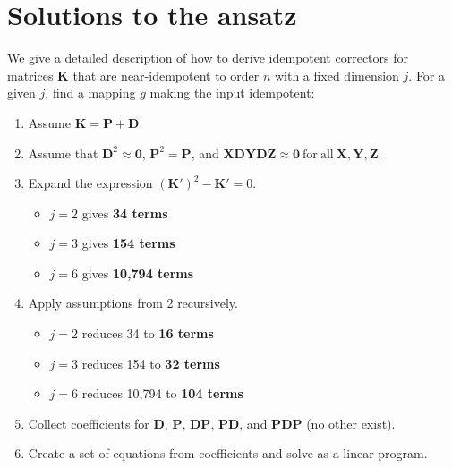 \documentclass{article}
\theoremstyle{plain}
\theoremstyle{definition}
\theoremstyle{remark}
\newcommand{\vD}{\mathbf{D}}
\newcommand{\vK}{\mathbf{K}}
\newcommand{\vP}{\mathbf{P}}
\newcommand{\vX}{\mathbf{X}}
\newcommand{\vY}{\mathbf{Y}}
\newcommand{\vZ}{\mathbf{Z}}
\begin{document}
\section{Solutions to the ansatz}
\label{app:solutions}
We give a detailed description of how to derive idempotent correctors for matrices $\vK$ that are near-idempotent to order $n$ with a fixed dimension $j$. For a given $j$, find a mapping $g$ making the input idempotent:
\begin{enumerate}
    \item Assume $\vK = \vP + \vD$.
    \item {Assume that $\vD^2 \approx \bm{0}$, $\vP^2 = \vP$, and $\vX \vD \vY \vD \vZ \approx \bm{0} \mathrm{~for~all~} \vX,\vY,\vZ$.}
    \item {Expand the expression $(\vK')^2 - \vK' = 0$.
          \begin{itemize}
              \item $j = 2$ gives \textbf{34 terms}
              \item $j = 3$ gives \textbf{154 terms}
              \item $j = 6$ gives \textbf{10,794 terms}
          \end{itemize}
          }
    \item {Apply assumptions from 2 recursively.
          \begin{itemize}
              \item $j = 2$ reduces 34 to \textbf{16 terms}
              \item $j = 3$ reduces 154 to \textbf{32 terms}
              \item $j = 6$ reduces 10,794 to \textbf{104 terms}
          \end{itemize}
          }
    \item Collect coefficients for $\vD$, $\vP$, $\vD\vP$, $\vP\vD$, and $\vP\vD\vP$ (no other exist).
    \item Create a set of equations from coefficients and solve as a linear program.
\end{enumerate}
\end{document}
